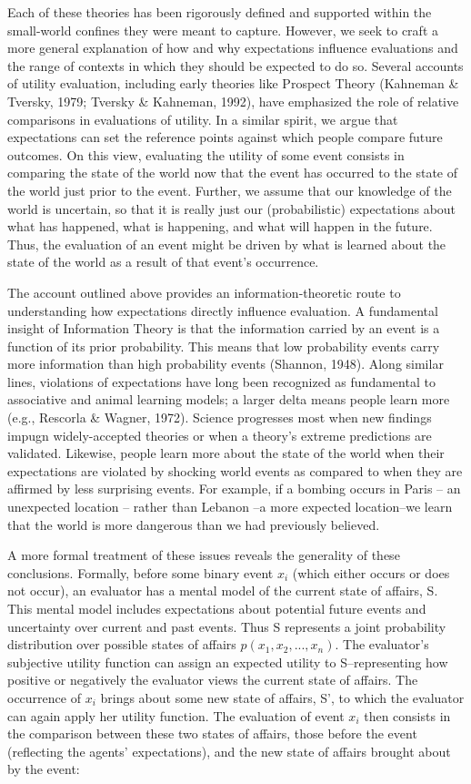 \documentclass[12pt,]{article}
\begin{document}
Each of these theories has been rigorously defined and supported within
the small-world confines they were meant to capture. However, we seek to
craft a more general explanation of how and why expectations influence
evaluations and the range of contexts in which they should be expected
to do so. Several accounts of utility evaluation, including early
theories like Prospect Theory (Kahneman \& Tversky, 1979; Tversky \&
Kahneman, 1992), have emphasized the role of relative comparisons in
evaluations of utility. In a similar spirit, we argue that expectations
can set the reference points against which people compare future
outcomes. On this view, evaluating the utility of some event consists in
comparing the state of the world now that the event has occurred to the
state of the world just prior to the event. Further, we assume that our
knowledge of the world is uncertain, so that it is really just our
(probabilistic) expectations about what has happened, what is happening,
and what will happen in the future. Thus, the evaluation of an event
might be driven by what is learned about the state of the world as a
result of that event's occurrence.

The account outlined above provides an information-theoretic route to
understanding how expectations directly influence evaluation. A
fundamental insight of Information Theory is that the information
carried by an event is a function of its prior probability. This means
that low probability events carry more information than high probability
events (Shannon, 1948). Along similar lines, violations of expectations
have long been recognized as fundamental to associative and animal
learning models; a larger delta means people learn more (e.g., Rescorla
\& Wagner, 1972). Science progresses most when new findings impugn
widely-accepted theories or when a theory's extreme predictions are
validated. Likewise, people learn more about the state of the world when
their expectations are violated by shocking world events as compared to
when they are affirmed by less surprising events. For example, if a
bombing occurs in Paris -- an unexpected location -- rather than Lebanon
--a more expected location--we learn that the world is more dangerous
than we had previously believed.

A more formal treatment of these issues reveals the generality of these
conclusions. Formally, before some binary event \(x_i\) (which either
occurs or does not occur), an evaluator has a mental model of the
current state of affairs, S. This mental model includes expectations
about potential future events and uncertainty over current and past
events. Thus S represents a joint probability distribution over possible
states of affairs \(p(x_1, x_2, ..., x_n)\). The evaluator's subjective
utility function can assign an expected utility to S--representing how
positive or negatively the evaluator views the current state of affairs.
The occurrence of \(x_i\) brings about some new state of affairs, S', to
which the evaluator can again apply her utility function. The evaluation
of event \(x_i\) then consists in the comparison between these two
states of affairs, those before the event (reflecting the agents'
expectations), and the new state of affairs brought about by the event:
\end{document}
